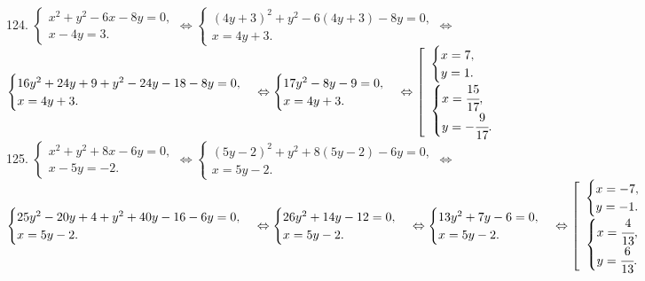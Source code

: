 \documentclass[12pt]{article}
\begin{document}
124. $\begin{cases} x^2+y^2-6x-8y=0,\\ x-4y=3.\end{cases}\Leftrightarrow
\begin{cases} (4y+3)^2+y^2-6(4y+3)-8y=0,\\ x=4y+3.\end{cases}\Leftrightarrow$\\$
\begin{cases} 16y^2+24y+9+y^2-24y-18-8y=0,\\ x=4y+3.\end{cases}\Leftrightarrow
\begin{cases} 17y^2-8y-9=0,\\ x=4y+3.\end{cases}\Leftrightarrow
\left[\begin{array}{l}\begin{cases}x=7,\\y=1.\end{cases}\\
\begin{cases}x=\cfrac{15}{17},\\y=-\cfrac{9}{17}.\end{cases}\end{array}\right.$\\
125. $\begin{cases} x^2+y^2+8x-6y=0,\\ x-5y=-2.\end{cases}\Leftrightarrow
\begin{cases} (5y-2)^2+y^2+8(5y-2)-6y=0,\\ x=5y-2.\end{cases}\Leftrightarrow$\\$
\begin{cases} 25y^2-20y+4+y^2+40y-16-6y=0,\\ x=5y-2.\end{cases}\Leftrightarrow
\begin{cases} 26y^2+14y-12=0,\\ x=5y-2.\end{cases}\Leftrightarrow
\begin{cases} 13y^2+7y-6=0,\\ x=5y-2.\end{cases}\Leftrightarrow
\left[\begin{array}{l}\begin{cases}x=-7,\\y=-1.\end{cases}\\
\begin{cases}x=\cfrac{4}{13},\\y=\cfrac{6}{13}.\end{cases}\end{array}\right.$
\newpage
\end{document}
